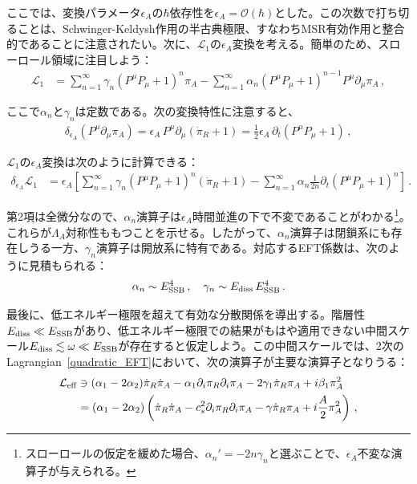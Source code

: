 ここでは、変換パラメータ$\epsilon_A$の$\hbar$依存性を$\epsilon_A=\mathcal{O}(\hbar)$とした。この次数で打ち切ることは、Schwinger-Keldysh作用の半古典極限、すなわちMSR有効作用と整合的であることに注意されたい。次に、$\mathcal{L}_1$の$\epsilon_A$変換を考える。簡単のため、スローロール領域に注目しよう：
\begin{align}
\mathcal{L}_1&=
\sum_{n=1}^\infty\gamma_n(P^\mu P_\mu+1)^n\pi_A
-\sum_{n=1}^\infty\alpha_n(P^\mu P_\mu+1)^{n-1}P^\mu\partial_\mu\pi_A
\,,
\end{align}

ここで$\alpha_n$と$\gamma_n$は定数である。次の変換特性に注意すると、
\begin{align}
\delta_{\epsilon_A} (P^\mu\partial_\mu\pi_A)=\epsilon_A\,P^\mu\partial_\mu(\dot{\pi}_R+1)=\frac{1}{2}\epsilon_A\,\partial_t(P^\mu P_\mu+1)\,,
\end{align}

$\mathcal{L}_1$の$\epsilon_A$変換は次のように計算できる：
\begin{align}
\delta_{\epsilon_A} \mathcal{L}_1&=
\epsilon_A\left[
\sum_{n=1}^\infty\gamma_n(P^\mu P_\mu+1)^n(\dot{\pi}_R+1)
-\sum_{n=1}^\infty\alpha_n\frac{1}{2n}\partial_t(P^\mu P_\mu+1)^{n}
\right]
\,.
\end{align}

第2項は全微分なので、$\alpha_n$演算子は$\epsilon_A$時間並進の下で不変であることがわかる\footnote{\label{footnote:non-slow_roll}スローロールの仮定を緩めた場合、$\alpha_n'= - 2n\gamma_n$と選ぶことで、$\epsilon_A$不変な演算子が与えられる。}。これらが$\Lambda_A$対称性ももつことを示せる。したがって、$\alpha_n$演算子は閉鎖系にも存在しうる一方、$\gamma_n$演算子は開放系に特有である。対応するEFT係数は、次のように見積もられる：
\begin{align}
\alpha_n\sim E_{\rm SSB}^4\,,
\quad
\gamma_n\sim E_{\rm diss}\,E_{\rm SSB}^4\,.
\end{align}

\medskip
最後に、低エネルギー極限を超えて有効な分散関係を導出する。階層性$E_{\rm diss}\ll E_{\rm SSB}$があり、低エネルギー極限での結果がもはや適用できない中間スケール$E_{\rm diss}\lesssim \omega\ll E_{\rm SSB}$が存在すると仮定しよう。この中間スケールでは、2次のLagrangian~\eqref{quadratic_EFT}において、次の演算子が主要な演算子となりうる：
\begin{align}
\nonumber
\mathcal{L}_{\rm eff}&\ni
(\alpha_1-2\alpha_2)\dot{\pi}_R\dot{\pi}_A-\alpha_1\partial_i\pi_R\partial_i\pi_A
-2\gamma_1\dot{\pi}_R\pi_A+i\beta_1\pi_A^2
\\
&=
(\alpha_1-2\alpha_2)\left(
\dot{\pi}_R\dot{\pi}_A-c_s^2\partial_i\pi_R\partial_i\pi_A
-\gamma\dot{\pi}_R\pi_A+i\frac{A}{2}\pi_A^2
\right)
\,,
\label{eq:lag_eff_intscale}
\end{align}

